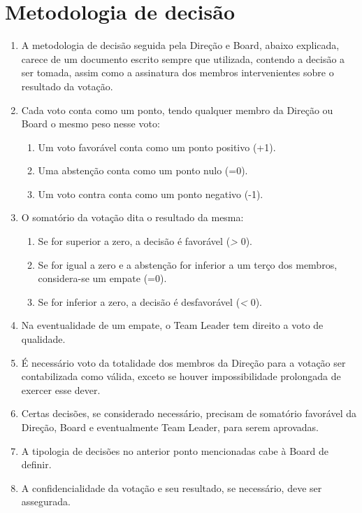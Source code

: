 \section{Metodologia de decisão}
\begin{enumerate}
  \item A metodologia de decisão seguida pela Direção e Board, abaixo explicada, carece de um documento escrito sempre que utilizada, contendo a decisão a ser tomada, assim como a assinatura dos membros intervenientes sobre o resultado da votação.
  \item Cada voto conta como um ponto, tendo qualquer membro da Direção ou Board o mesmo peso nesse voto:
  \begin{enumerate}
    \item Um voto favorável conta como um ponto positivo (+1).
    \item Uma abstenção conta como um ponto nulo (=0).
    \item Um voto contra conta como um ponto negativo (-1).
  \end{enumerate}
  \item O somatório da votação dita o resultado da mesma:
  \begin{enumerate}
    \item Se for superior a zero, a decisão é favorável (\textit{>} 0).
    \item Se for igual a zero e a abstenção for inferior a um terço dos membros, considera-se um empate (=0).
    \item Se for inferior a zero, a decisão é desfavorável (\textit{<} 0).
  \end{enumerate}
  \item Na eventualidade de um empate, o Team Leader tem direito a voto de qualidade.
  \item É necessário voto da totalidade dos membros da Direção para a votação ser contabilizada como válida, exceto se houver impossibilidade prolongada de exercer esse dever.
  \item Certas decisões, se considerado necessário, precisam de somatório favorável da Direção, Board e eventualmente Team Leader, para serem aprovadas.
  \item A tipologia de decisões no anterior ponto mencionadas cabe à Board de definir.
  \item A confidencialidade da votação e seu resultado, se necessário, deve ser assegurada.
\end{enumerate}

